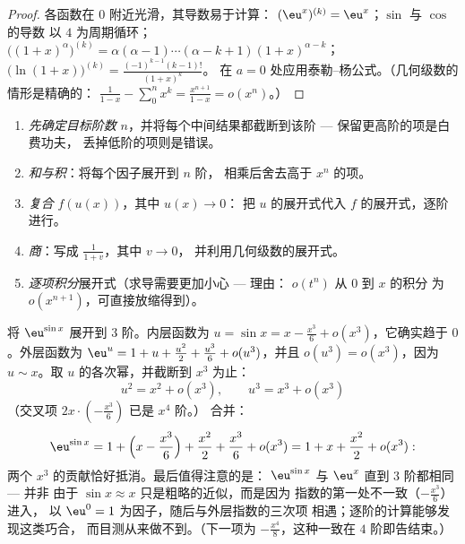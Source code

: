 \begin{proof}
各函数在 $0$ 附近光滑，其导数易于计算：
$(\eu^x)^{(k)} = \eu^x$；$\sin$ 与 $\cos$ 的导数
以 $4$ 为周期循环；$\bigl((1+x)^\alpha\bigr)^{(k)} = \alpha(\alpha -
1)\cdots(\alpha - k + 1)(1+x)^{\alpha - k}$；
$\bigl(\ln(1+x)\bigr)^{(k)} = \frac{(-1)^{k-1}(k-1)!}{(1+x)^k}$。
在 $a = 0$ 处应用泰勒–杨公式。（几何级数的情形是精确的：
$\frac{1}{1-x} - \sum_0^n x^k = \frac{x^{n+1}}{1 - x} = o(x^n)$。）
\end{proof}

\begin{method}[利用展开式计算]\label{met:b1:taylor:compute}
\begin{enumerate}
  \item \emph{先确定目标阶数} $n$，并将每个中间结果都截断到该阶
        --- 保留更高阶的项是白费功夫，
        丢掉低阶的项则是错误。
  \item \emph{和与积}：将每个因子展开到 $n$ 阶，
        相乘后舍去高于 $x^n$ 的项。
  \item \emph{复合} $f(u(x))$，其中 $u(x) \to 0$：
        把 $u$ 的展开式代入 $f$ 的展开式，逐阶进行。
  \item \emph{商}：写成 $\frac{1}{1 + v}$，其中 $v \to 0$，
        并利用几何级数的展开式。
  \item \emph{逐项积分}展开式（求导需要更加小心 --- 理由：
        $o(t^n)$ 从 $0$ 到 $x$ 的积分
        为 $o(x^{n+1})$，可直接放缩得到）。
\end{enumerate}
\end{method}

\begin{example}[复合，并列出逐阶计算]\label{ex:b1:taylor:esin}
将 $\eu^{\sin x}$ 展开到 $3$ 阶。内层函数为 $u = \sin x
= x - \frac{x^3}{6} + o(x^3)$，它确实趋于 $0$。外层函数为
$\eu^u = 1 + u + \frac{u^2}{2} + \frac{u^3}{6} + o(u^3)$，并且
$o(u^3) = o(x^3)$，因为 $u \sim x$。取 $u$ 的各次幂，并截断到
$x^3$ 为止：
\[
u^2 = x^2 + o(x^3), \qquad u^3 = x^3 + o(x^3)
\]
（交叉项 $2x\cdot(-\frac{x^3}{6})$ 已是 $x^4$ 阶。）
合并：
\[
\eu^{\sin x} = 1 + \Bigl(x - \frac{x^3}{6}\Bigr) + \frac{x^2}{2}
+ \frac{x^3}{6} + o(x^3)
= 1 + x + \frac{x^2}{2} + o(x^3) :
\]
两个 $x^3$ 的贡献恰好抵消。最后值得注意的是：
$\eu^{\sin x}$ 与 $\eu^x$ 直到 $3$ 阶都相同 --- 并非
由于 $\sin x \approx x$ 只是粗略的近似，而是因为
指数的第一处不一致（$-\frac{x^3}{6}$）进入，
以 $\eu^0 = 1$ 为因子，随后与外层指数的三次项
相遇；逐阶的计算能够发现这类巧合，
而目测从来做不到。（下一项为
$-\frac{x^4}{8}$，这种一致在 $4$ 阶即告结束。）
\end{example}

